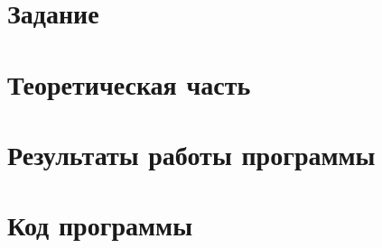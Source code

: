 \documentclass[12pt, a4paper]{article}
\begin{document}
	
	
	
	\section{Задание}
	
	
	\section{Теоретическая часть}
	
	\newpage
	
	\section{Результаты работы программы}
	
	\newpage
	
	
	\section{Код программы}
	
	
\end{document}
